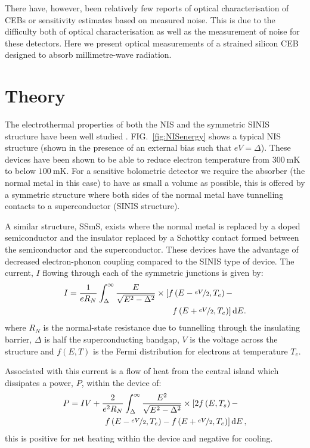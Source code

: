 \documentclass[aip, apl, a4paper, amsmath,amssymb, reprint]{revtex4-1}
\begin{document}
There have, however, been relatively few reports of optical characterisation of CEBs or sensitivity estimates based on measured noise. This is due to the difficulty both of optical characterisation as well as the measurement of noise for these detectors. Here we present optical measurements of a strained silicon CEB designed to absorb millimetre-wave radiation.

\section{Theory} \label{sec:Theory} 
The electrothermal properties of both the NIS and the symmetric SINIS structure have been well studied \cite{Pekola05, Nahum93, Nahum94, Leivo96, Savin01, Pekola04}. FIG.~\ref{fig:NISenergy} shows a typical NIS structure (shown in the presence of an external bias such that $eV = \Delta$). These devices have been shown\cite{Pekola04} to be able to reduce electron temperature from $300~\mathrm{mK}$ to below $100~\mathrm{mK}$. For a sensitive bolometric detector we require the absorber (the normal metal in this case) to have as small a volume as possible, this is offered by a symmetric structure where both sides of the normal metal have tunnelling contacts to a superconductor (SINIS structure). 

A similar structure, SSmS, exists where the normal metal is replaced by a doped semiconductor and the insulator replaced by a Schottky contact formed between the semiconductor and the superconductor\cite{Savin01}. These devices have the advantage of decreased electron-phonon coupling compared to the SINIS type of device\cite{Prest11}. The current, $I$ flowing through each of the symmetric junctions is given by:
\begin{align}
I &=\frac{1}{eR_{N}}\int_{\Delta}^{\infty} \frac{E}{\sqrt{E^{2}-\Delta^{2}}}  \times \left[f\left(E-\nicefrac{eV}{2},T_{e}\right) - \right. \nonumber \\
&\qquad \qquad \qquad \qquad \qquad \qquad  \; \left. f\left(E+\nicefrac{eV}{2},T_{e}\right)\right] \mathrm{d}E. \label{eq:IV}
\end{align}
where $R_{N}$ is the normal-state resistance due to tunnelling through the insulating barrier, $\Delta$ is half the superconducting bandgap, $V$ is the  voltage across the structure and  $f\left(E,T\right)$ is the Fermi distribution for electrons at temperature $T_{e}$.

Associated with this current is a flow of heat from the central island which dissipates a power, $P$, within the device of:
\begin{align}
P &= IV + \frac{2}{e^{2}R_{N}}\int_{\Delta}^{\infty} \frac{E^{2}}{\sqrt{E^{2}-\Delta^{2}}} \times \left[2f\left(E,T_{s}\right) - \right. \nonumber \\ 
&\qquad \qquad  \left. f\left(E-\nicefrac{eV}{2},T_{e}\right)- f\left(E+\nicefrac{eV}{2}, T_{e}\right)\right] \mathrm{d}E\, , \label{eqn:Pc}
\end{align}
this is positive for net heating within the device and negative for cooling.
\end{document}
